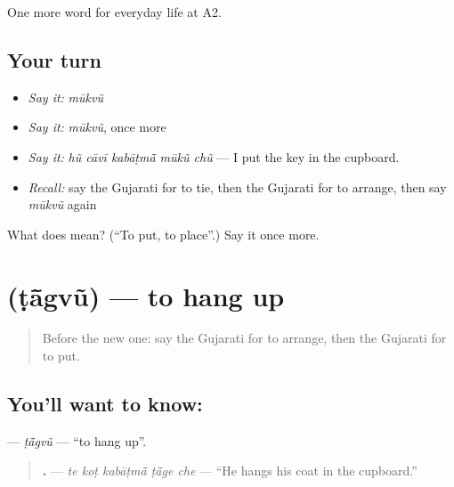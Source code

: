 \begin{grammarlens}[title={What you've built}]
One more word for everyday life at A2.
\end{grammarlens}

\subsection*{Your turn}
\begin{itemize}
\raggedright
  \item \emph{Say it:} \emph{mūkvũ}
  \item \emph{Say it:} \emph{mūkvũ}, once more
  \item \emph{Say it:} \emph{hũ cāvī kabāṭmā̃ mūkũ chũ} — I put the key in the cupboard.
  \item \emph{Recall:} say the Gujarati for to tie, then the Gujarati for to arrange, then say \emph{mūkvũ} again
\end{itemize}

\begin{tcolorbox}[breakable,colback=teal!4,colframe=teal!35!black,title={Before you move on}]
What does  mean? (\textquotedblleft{}To put, to place\textquotedblright{}.) Say it once more.
\end{tcolorbox}
\section[\texorpdfstring{\gu{ટાંગવું} (ṭā̃gvũ)}{ટાંગવું (ṭā̃gvũ)}]{ (ṭā̃gvũ) — to hang up}

\label{lesson:GU-C157-tagvu}



\begin{quote}
Before the new one: say the Gujarati for to arrange, then the Gujarati for to put.
\end{quote}

\subsection*{You'll want to know: }
\textbf{} — \emph{ṭā̃gvũ} — \textquotedblleft{}to hang up\textquotedblright{}.

\begin{quote}
\textbf{    .} — \emph{te koṭ kabāṭmā̃ ṭā̃ge che} — \textquotedblleft{}He hangs his coat in the cupboard.\textquotedblright{}
\end{quote}

